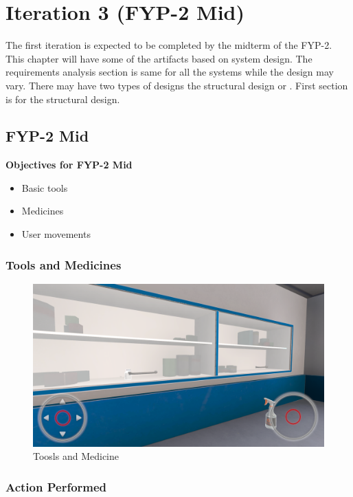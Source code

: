 \chapter{Iteration 3 (FYP-2 Mid)}
\label{ch:iter3}

The first iteration is expected to be completed by the midterm of the FYP-2.
This chapter will have some of the artifacts based on system design. The requirements analysis section is same for all the systems while the design may vary. There may have two types of designs the structural design or . First section is for the structural design.


\section{FYP-2 Mid}
\textbf{Objectives for FYP-2 Mid}
	\begin{itemize}
		\item Basic tools
		\item Medicines 
		\item User movements
	\end{itemize}
\newpage
\subsection{Tools and Medicines}
\begin{figure}[h]
	\centering
	\includegraphics[width=0.65\linewidth]{Images/Toosls and Medicine.png}
	\caption{Toosls and Medicine}
	\label{fig:system-diagram}
\end{figure}

\subsection{Action Performed}
